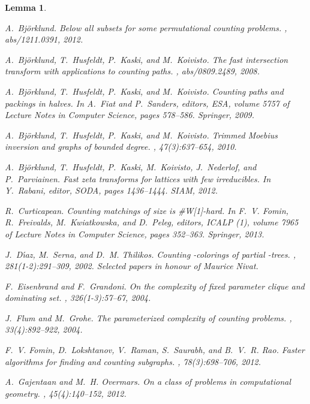 \documentclass{amsart}
\newtheorem{Lem}{Lemma}
\begin{document}
\begin{Lem}
\begin{thebibliography}{10}
A.~Bj\"orklund.
\newblock Below all subsets for some permutational counting problems.
, abs/1211.0391, 2012.

A.~Bj{\"o}rklund, T.~Husfeldt, P.~Kaski, and M.~Koivisto.
\newblock The fast intersection transform with applications to counting paths.
, abs/0809.2489, 2008.

A.~Bj{\"o}rklund, T.~Husfeldt, P.~Kaski, and M.~Koivisto.
\newblock Counting paths and packings in halves.
\newblock In A.~Fiat and P.~Sanders, editors, {\em ESA}, volume 5757 of {\em
  Lecture Notes in Computer Science}, pages 578--586. Springer, 2009.

A.~Bj{\"o}rklund, T.~Husfeldt, P.~Kaski, and M.~Koivisto.
\newblock Trimmed {M}oebius inversion and graphs of bounded degree.
, 47(3):637--654, 2010.

A.~Bj{\"o}rklund, T.~Husfeldt, P.~Kaski, M.~Koivisto, J.~Nederlof, and
  P.~Parviainen.
\newblock Fast zeta transforms for lattices with few irreducibles.
\newblock In Y.~Rabani, editor, {\em SODA}, pages 1436--1444. SIAM, 2012.

R.~Curticapean.
\newblock Counting matchings of size  is {\#}{W}[1]-hard.
\newblock In F.~V. Fomin, R.~Freivalds, M.~Kwiatkowska, and D.~Peleg, editors,
  {\em ICALP (1)}, volume 7965 of {\em Lecture Notes in Computer Science},
  pages 352--363. Springer, 2013.

J.~D{\'{\i}}az, M.~Serna, and D.~M. Thilikos.
\newblock Counting {}-colorings of partial {}-trees.
, 281(1-2):291--309, 2002.
\newblock Selected papers in honour of Maurice Nivat.

F.~Eisenbrand and F.~Grandoni.
\newblock On the complexity of fixed parameter clique and dominating set.
, 326(1-3):57--67, 2004.

J.~Flum and M.~Grohe.
\newblock The parameterized complexity of counting problems.
, 33(4):892--922, 2004.

F.~V. Fomin, D.~Lokshtanov, V.~Raman, S.~Saurabh, and B.~V.~R. Rao.
\newblock Faster algorithms for finding and counting subgraphs.
, 78(3):698--706, 2012.

A.~Gajentaan and M.~H. Overmars.
\newblock On a class of {} problems in computational geometry.
, 45(4):140--152, 2012.


\end{thebibliography}
\end{Lem}
\end{document}
